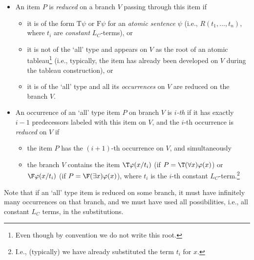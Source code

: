 \begin{definition}
\begin{itemize}
        \item An item $P$ is \emph{reduced} on a branch $V$ passing through this item if 
        \begin{itemize}
            \item it is of the form $\mathrm{T}\psi$ or $\mathrm{F}\psi$ for an \emph{atomic sentence} $\psi$ (i.e., $R(t_1,\dots,t_n)$, where $t_i$ are \emph{constant} $L_C$-terms), or
            \item it is not of the `all' type and appears on $V$ as the root of an atomic tableau\footnote{Even though by convention we do not write this root.} (i.e., typically, the item has already been developed on $V$ during the tableau construction), or
            \item it is of the `all' type and all its \emph{occurrences} on $V$ are reduced on the branch $V$.
        \end{itemize}
        \item An occurrence of an `all' type item $P$ on branch $V$ is \emph{$i$-th} if it has exactly $i-1$ predecessors labeled with this item on $V$, and the $i$-th occurrence is \emph{reduced} on $V$ if
        \begin{itemize}
            \item the item $P$ has the $(i+1)$-th occurrence on $V$, and simultaneously
            \item the branch $V$ contains the item $\T\varphi(x/t_i)$ (if $P=\T(\forall x)\varphi(x)$) or $\F\varphi(x/t_i)$ (if $P=\F(\exists x)\varphi(x)$), where $t_i$ is the $i$-th constant $L_C$-term.\footnote{I.e., (typically) we have already substituted the term $t_i$ for $x$.}
        \end{itemize} 
    \end{itemize}
\end{definition}
Note that if an `all' type item is reduced on some branch, it must have infinitely many occurrences on that branch, and we must have used all possibilities, i.e., all constant $L_C$ terms, in the substitutions.

